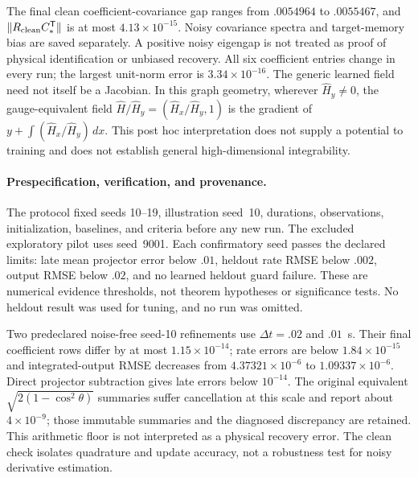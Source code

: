 \documentclass[journal]{IEEEtran}
\begin{document}
The final clean coefficient-covariance gap ranges from $.0054964$ to
$.0055467$, and $\|R_{\rm clean}C_*^{\mathsf T}\|$ is at most
$4.13\times10^{-15}$. Noisy covariance spectra and target-memory bias are
saved separately. A positive noisy eigengap is not treated as proof of
physical identification or unbiased recovery. All six coefficient entries
change in every run; the largest unit-norm error is $3.34\times10^{-16}$.
The generic learned field need not itself be a Jacobian. In this graph
geometry, wherever $\widehat H_y\ne0$, the gauge-equivalent field
$\widehat H/\widehat H_y=(\widehat H_x/\widehat H_y,1)$ is the gradient of
$y+\int (\widehat H_x/\widehat H_y)\,dx$. This post hoc interpretation does
not supply a potential to training and does not establish general
high-dimensional integrability.

\paragraph{Prespecification, verification, and provenance.}
The protocol fixed seeds 10--19, illustration seed~10, durations, observations,
initialization, baselines, and criteria before any new run. The excluded
exploratory pilot uses seed~9001. Each confirmatory seed passes the declared
limits: late mean projector error below $.01$, heldout rate RMSE below
$.002$, output RMSE below $.02$, and no learned heldout guard failure. These
are numerical evidence thresholds, not theorem hypotheses or significance
tests. No heldout result was used for tuning, and no run was omitted.

Two predeclared noise-free seed-10 refinements use $\Delta t=.02$ and $.01$~s.
Their final coefficient rows differ by at most $1.15\times10^{-14}$;
rate errors are below $1.84\times10^{-15}$ and integrated-output RMSE decreases
from $4.37321\times10^{-6}$ to $1.09337\times10^{-6}$. Direct projector
subtraction gives late errors below $10^{-14}$. The original equivalent
$\sqrt{2(1-\cos^2\theta)}$ summaries suffer cancellation at this scale and
report about $4\times10^{-9}$; those immutable summaries and the diagnosed
discrepancy are retained. This arithmetic floor is not interpreted as a
physical recovery error. The clean check isolates quadrature and update
accuracy, not a robustness test for noisy derivative estimation.
\end{document}
